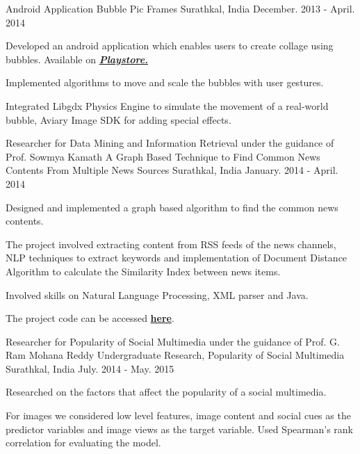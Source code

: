 \begin{cventries}
    \cventry
    {Android Application}
    {Bubble Pic Frames}
    {Surathkal, India}
    {December. 2013 - April. 2014}
    {
      \begin{cvitems}
        \item {Developed an android application which enables users to create collage using bubbles. Available on  \href{https://play.google.com/store/apps/details?id=com.applications.bubblepicframes&hl=en}{\textit{\textbf{Playstore.}}}}
        \item {Implemented algorithms to move and scale the bubbles with user gestures.}
        \item {Integrated Libgdx Physics Engine to simulate the movement of a real-world bubble, Aviary Image SDK for adding special effects.}
      \end{cvitems}
    }
    \cventry
    {Researcher for Data Mining and Information Retrieval under the guidance of Prof. Sowmya Kamath}
    {A Graph Based Technique to Find Common News Contents From Multiple News Sources}
    {Surathkal, India}
    {January. 2014 - April. 2014}
    {
      \begin{cvitems}
        \item {Designed and implemented a graph based algorithm to find the common news contents.}
        \item {The project involved extracting content from RSS feeds of the news channels, NLP techniques to extract keywords and implementation of Document Distance Algorithm to calculate the Similarity Index between news items.}
        \item {Involved skills on Natural Language Processing, XML parser and Java.}
        \item {The project code can be accessed \href{https://github.com/varun93/graph-similarity}{\textbf{here}}.}
      \end{cvitems}
    }
    \cventry
    {Researcher for Popularity of Social Multimedia under the guidance of Prof. G. Ram Mohana Reddy}
    {Undergraduate Research, Popularity of Social Multimedia}
    {Surathkal, India}
    {July. 2014 - May. 2015}
    {
      \begin{cvitems}
        \item {Researched on the factors that affect the popularity of a social multimedia.}
        \item{For images we considered low level features, image content and social cues as the predictor variables and image views as the target variable. Used Spearman's rank correlation for evaluating the model.}

\end{cvitems}}
\end{cventries}
